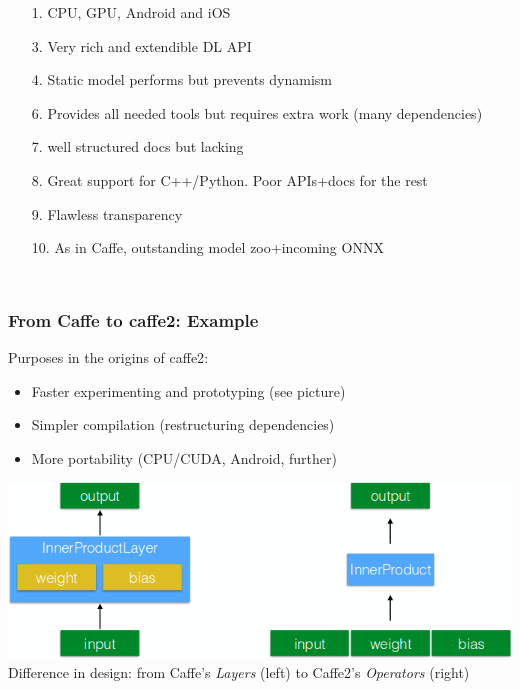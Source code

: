 \documentclass[hyperref={pdfpagelabels=false}]{beamer}
\begin{document}
\begin{frame}
\begin{columns}[t]
\begin{tikzpicture}
         \end{tikzpicture}
         \begin{itemize}
         \item[\scriptsize{\textcolor{visiblered}{1.}}] \scriptsize{CPU, GPU, Android and iOS}
         \item[\scriptsize{\textcolor{visiblegreen}{3.}}] \scriptsize{Very rich and extendible DL API}
         \item[\scriptsize{\textcolor{visiblegreen}{4.}}] \scriptsize{Static model performs but prevents dynamism}
         \item[\scriptsize{\textcolor{visiblegreen}{6.}}] \scriptsize{Provides all needed tools but requires extra work (many dependencies)}
         \item[\scriptsize{\textcolor{visibleblue}{7.}}] \scriptsize{well structured docs but lacking}
         \item[\scriptsize{\textcolor{visibleblue}{8.}}] \scriptsize{Great support for C++/Python. Poor APIs+docs for the rest}
         \item[\scriptsize{\textcolor{visibleblue}{9.}}] \scriptsize{Flawless transparency}
         \item[\scriptsize{\textcolor{visibleblue}{10.}}] \scriptsize{As in Caffe, outstanding model zoo+incoming ONNX\cite{onnx}}
         \end{itemize}
          \end{columns}
     \end{frame}


      \begin{frame}
       \frametitle{From Caffe to caffe2: Example}
       Purposes in the origins of caffe2\cite{about-caffe2-birth}:
       \begin{itemize}[<.->]
       \item Faster experimenting and prototyping (see picture)
       \item Simpler compilation (restructuring dependencies)
       \item More portability (CPU/CUDA, Android, further)
       \end{itemize}
       \vspace{4mm}
       \begin{center}
         \includegraphics[scale=0.46]{improve_caffe.png}
         \scriptsize{\\Difference in design: from Caffe's \textit{Layers} (left) to Caffe2's \textit{Operators} (right)\cite{improving-caffe}}
       \end{center}
       \end{frame}
\end{document}
